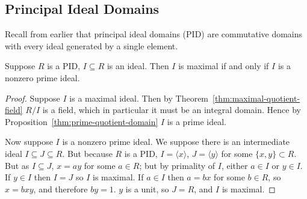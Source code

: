 \subsection*{Principal Ideal Domains}

\begin{remark}
    Recall from earlier that principal ideal domains (PID)
    are commutative domains with every ideal generated by a single element.
\end{remark}
\begin{proposition}\label{prop:pid-maximal-is-prime}
    Suppose \(R\) is a PID, \(I \subseteq R\) is an ideal.
    Then \(I\) is maximal if and only if \(I\) is a nonzero prime ideal.
\end{proposition}
\begin{proof}
    Suppose \(I\) is a maximal ideal.
    Then by Theorem~\ref{thm:maximal-quotient-field} \(R/I\) is a field,
    which in particular it must be an integral domain.
    Hence by Proposition~\ref{thm:prime-quotient-domain} \(I\) is a prime ideal.

    Now suppose \(I\) is a nonzero prime ideal.
    We suppose there is an intermediate ideal \(I \subseteq J \subseteq R\).
    But because \(R\) is a PID,
    \(I = \langle x \rangle\), \(J = \langle y \rangle\)
    for some \(\{x,y\} \subset R\).
    But as \(I \subseteq J\), \(x = ay\) for some \(a \in R\);
    but by primality of \(I\), either \(a \in I\) or \(y \in I\).
    If \(y \in I\) then \(I = J\) so \(I\) is maximal.
    If \(a \in I\) then \(a = bx\) for some \(b \in R\),
    so \(x = bxy\), and therefore \(by = 1\).
    \(y\) is a unit, so \(J = R\), and \(I\) is maximal.
\end{proof}

